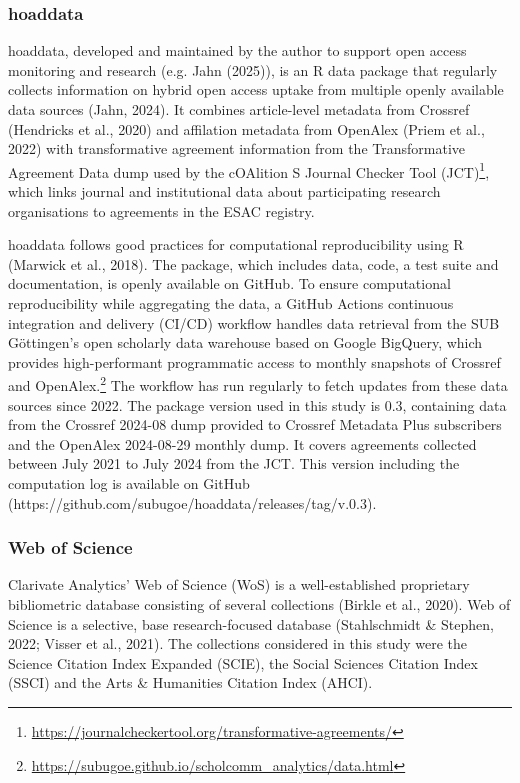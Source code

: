 \documentclass[a4paper,man,floatsintext,longtable,noextraspace,10pt]{apa6}
\begin{document}
\subsubsection{hoaddata}\label{hoaddata}

hoaddata, developed and maintained by the author to support open access
monitoring and research (e.g. Jahn (2025)), is an R data package that
regularly collects information on hybrid open access uptake from
multiple openly available data sources (Jahn, 2024). It combines
article-level metadata from Crossref (Hendricks et al., 2020) and
affilation metadata from OpenAlex (Priem et al., 2022) with
transformative agreement information from the Transformative Agreement
Data dump used by the cOAlition S Journal Checker Tool (JCT)\footnote{\url{https://journalcheckertool.org/transformative-agreements/}},
which links journal and institutional data about participating research
organisations to agreements in the ESAC registry.

hoaddata follows good practices for computational reproducibility using
R (Marwick et al., 2018). The package, which includes data, code, a test
suite and documentation, is openly available on GitHub. To ensure
computational reproducibility while aggregating the data, a GitHub
Actions continuous integration and delivery (CI/CD) workflow handles
data retrieval from the SUB Göttingen's open scholarly data warehouse
based on Google BigQuery, which provides high-performant programmatic
access to monthly snapshots of Crossref and OpenAlex.\footnote{\url{https://subugoe.github.io/scholcomm_analytics/data.html}}
The workflow has run regularly to fetch updates from these data sources
since 2022. The package version used in this study is 0.3, containing
data from the Crossref 2024-08 dump provided to Crossref Metadata Plus
subscribers and the OpenAlex 2024-08-29 monthly dump. It covers
agreements collected between July 2021 to July 2024 from the JCT. This
version including the computation log is available on GitHub
(https://github.com/subugoe/hoaddata/releases/tag/v.0.3).

\subsubsection{Web of Science}\label{web-of-science}

Clarivate Analytics' Web of Science (WoS) is a well-established
proprietary bibliometric database consisting of several collections
(Birkle et al., 2020). Web of Science is a selective, base
research-focused database (Stahlschmidt \& Stephen, 2022; Visser et al.,
2021). The collections considered in this study were the Science
Citation Index Expanded (SCIE), the Social Sciences Citation Index
(SSCI) and the Arts \& Humanities Citation Index (AHCI).
\end{document}
